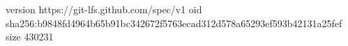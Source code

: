 version https://git-lfs.github.com/spec/v1
oid sha256:b9848fd4964b65b91bc342672f5763ecad312d578a65293ef593b42131a25fef
size 430231
